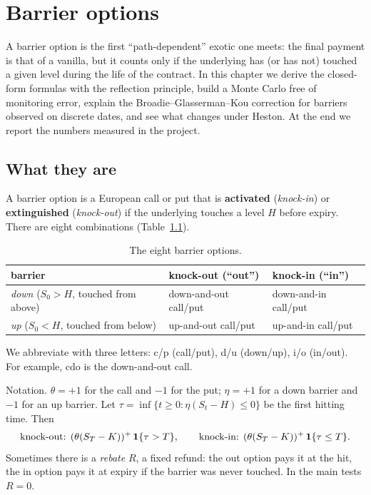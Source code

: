 \chapter{Barrier options}
\label{cap:barriere}

A barrier option is the first ``path-dependent'' exotic one meets: the final payment is that of a vanilla, but it
counts only if the underlying has (or has not) touched a given level during the life of the contract. In this chapter
we derive the closed-form formulas with the reflection principle, build a Monte Carlo free of monitoring error,
explain the Broadie--Glasserman--Kou correction for barriers observed on discrete dates, and see what changes under
Heston. At the end we report the numbers measured in the project.

\section{What they are}
A barrier option is a European call or put that is \textbf{activated} (\emph{knock-in}) or \textbf{extinguished}
(\emph{knock-out}) if the underlying touches a level $H$ before expiry. There are eight combinations
(Table~\ref{tab:barriere-tipi}).
\begin{table}[htbp]
\centering
\small
\caption{The eight barrier options.}
\label{tab:barriere-tipi}
\begin{tabularx}{\textwidth}{>{\raggedright\arraybackslash}Xll}
\toprule
barrier & knock-out (``out'') & knock-in (``in'')\\
\midrule
\emph{down} ($S_0>H$, touched from above) & down-and-out call/put & down-and-in call/put\\
\emph{up} ($S_0<H$, touched from below) & up-and-out call/put & up-and-in call/put\\
\bottomrule
\end{tabularx}
\end{table}

We abbreviate with three letters: c/p (call/put), d/u (down/up), i/o (in/out). For example, cdo is the down-and-out
call.

Notation. $\theta=+1$ for the call and $-1$ for the put; $\eta=+1$ for a down barrier and $-1$ for an up barrier. Let
$\tau=\inf\{t\ge0:\eta(S_t-H)\le0\}$ be the first hitting time. Then
\begin{equation}
\text{knock-out: }(\theta(S_T-K))^+\,\mathbf{1}\{\tau>T\},\qquad
\text{knock-in: }(\theta(S_T-K))^+\,\mathbf{1}\{\tau\le T\}.
\end{equation}
Sometimes there is a \emph{rebate} $R$, a fixed refund: the out option pays it at the hit, the in option pays it at
expiry if the barrier was never touched. In the main tests $R=0$.

